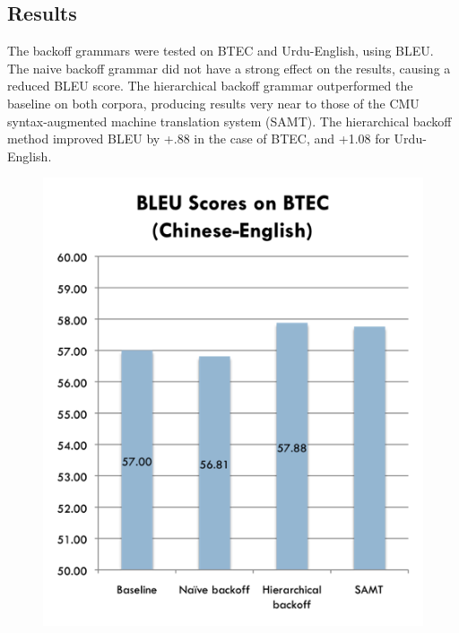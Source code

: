 \subsection{Results}

The backoff grammars were tested on BTEC and Urdu-English, using BLEU.  The naive backoff grammar did not have a strong effect on the results, causing a reduced BLEU score.  The hierarchical backoff grammar outperformed the baseline on both corpora, producing results very near to those of the CMU syntax-augmented machine translation system (SAMT).  The hierarchical backoff method improved BLEU by +.88 in the case of BTEC, and +1.08 for Urdu-English.

\begin{figure}
\label{fig:btec}
\includegraphics{btec.png}
\end{figure}

